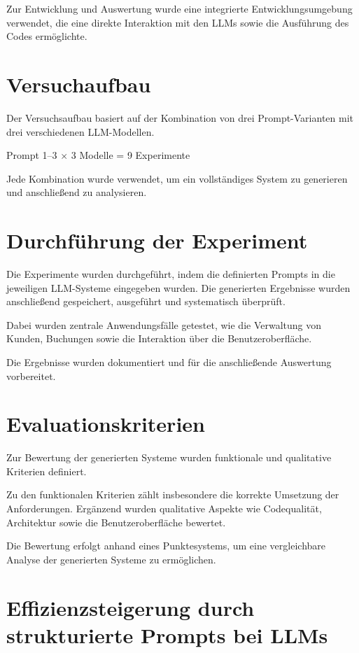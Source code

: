 Zur Entwicklung und Auswertung wurde eine integrierte
Entwicklungsumgebung verwendet, die eine direkte
Interaktion mit den LLMs sowie die Ausführung des Codes
ermöglichte.

\section{Versuchaufbau}

Der Versuchsaufbau basiert auf der Kombination von drei
Prompt-Varianten mit drei verschiedenen LLM-Modellen.

\begin{center}
Prompt 1–3 $\times$ 3 Modelle = 9 Experimente
\end{center}

Jede Kombination wurde verwendet, um ein vollständiges
System zu generieren und anschließend zu analysieren.

\section{Durchführung der Experiment}

Die Experimente wurden durchgeführt, indem die definierten
Prompts in die jeweiligen LLM-Systeme eingegeben wurden.
Die generierten Ergebnisse wurden anschließend gespeichert,
ausgeführt und systematisch überprüft.

Dabei wurden zentrale Anwendungsfälle getestet, wie die
Verwaltung von Kunden, Buchungen sowie die Interaktion
über die Benutzeroberfläche.

Die Ergebnisse wurden dokumentiert und für die
anschließende Auswertung vorbereitet.

\section{Evaluationskriterien}

Zur Bewertung der generierten Systeme wurden funktionale
und qualitative Kriterien definiert.

Zu den funktionalen Kriterien zählt insbesondere die
korrekte Umsetzung der Anforderungen. Ergänzend wurden
qualitative Aspekte wie Codequalität, Architektur sowie
die Benutzeroberfläche bewertet.

Die Bewertung erfolgt anhand eines Punktesystems, um eine
vergleichbare Analyse der generierten Systeme zu
ermöglichen.


\section{Effizienzsteigerung durch strukturierte Prompts bei LLMs}

